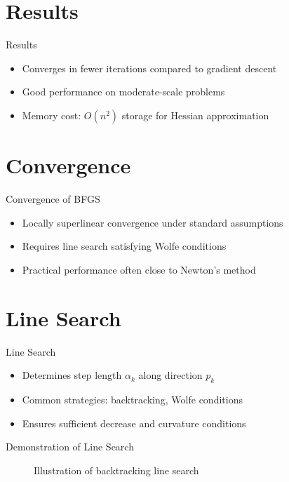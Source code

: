 \documentclass{beamer}
\begin{document}
\section{Results}
\begin{frame}{Results}
	\begin{itemize}
		\item Converges in fewer iterations compared to gradient descent
		\item Good performance on moderate-scale problems
		\item Memory cost: $O(n^2)$ storage for Hessian approximation
	\end{itemize}
\end{frame}

\section{Convergence}
\begin{frame}{Convergence of BFGS}
	\begin{itemize}
		\item Locally superlinear convergence under standard assumptions
		\item Requires line search satisfying Wolfe conditions
		\item Practical performance often close to Newton's method
	\end{itemize}
\end{frame}

\section{Line Search}
\begin{frame}{Line Search}
	\begin{itemize}
		\item Determines step length $\alpha_k$ along direction $p_k$
		\item Common strategies: backtracking, Wolfe conditions
		\item Ensures sufficient decrease and curvature conditions
	\end{itemize}
\end{frame}

\begin{frame}{Demonstration of Line Search}
	\begin{figure}
		\centering
		\caption{Illustration of backtracking line search}
	\end{figure}
\end{frame}
\end{document}
